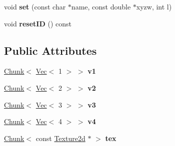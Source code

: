 \begin{DoxyCompactItemize}
\item 
\hypertarget{class_tempest_1_1_shader_input_acc0dcca2f2702d985cb5af596236c417}{void {\bfseries set} (const char $\ast$name, const double $\ast$xyzw, int l)}\label{class_tempest_1_1_shader_input_acc0dcca2f2702d985cb5af596236c417}

\item 
\hypertarget{class_tempest_1_1_shader_input_a1c6510d5221bc838ae7df197134ef480}{void {\bfseries reset\+I\+D} () const }\label{class_tempest_1_1_shader_input_a1c6510d5221bc838ae7df197134ef480}

\end{DoxyCompactItemize}
\subsection*{Public Attributes}
\begin{DoxyCompactItemize}
\item 
\hypertarget{class_tempest_1_1_shader_input_af6f24ecc1ce4afdccc8514c47ace04e5}{\hyperlink{struct_tempest_1_1_shader_input_1_1_chunk}{Chunk}$<$ \hyperlink{struct_tempest_1_1_shader_input_1_1_vec}{Vec}$<$ 1 $>$ $>$ {\bfseries v1}}\label{class_tempest_1_1_shader_input_af6f24ecc1ce4afdccc8514c47ace04e5}

\item 
\hypertarget{class_tempest_1_1_shader_input_a22c5d46725a2d6d776018016798e1d48}{\hyperlink{struct_tempest_1_1_shader_input_1_1_chunk}{Chunk}$<$ \hyperlink{struct_tempest_1_1_shader_input_1_1_vec}{Vec}$<$ 2 $>$ $>$ {\bfseries v2}}\label{class_tempest_1_1_shader_input_a22c5d46725a2d6d776018016798e1d48}

\item 
\hypertarget{class_tempest_1_1_shader_input_a8667a5efe121523eedc46b9c3569a0b8}{\hyperlink{struct_tempest_1_1_shader_input_1_1_chunk}{Chunk}$<$ \hyperlink{struct_tempest_1_1_shader_input_1_1_vec}{Vec}$<$ 3 $>$ $>$ {\bfseries v3}}\label{class_tempest_1_1_shader_input_a8667a5efe121523eedc46b9c3569a0b8}

\item 
\hypertarget{class_tempest_1_1_shader_input_aed010d7cc180c9925a51489a42e74323}{\hyperlink{struct_tempest_1_1_shader_input_1_1_chunk}{Chunk}$<$ \hyperlink{struct_tempest_1_1_shader_input_1_1_vec}{Vec}$<$ 4 $>$ $>$ {\bfseries v4}}\label{class_tempest_1_1_shader_input_aed010d7cc180c9925a51489a42e74323}

\item 
\hypertarget{class_tempest_1_1_shader_input_a76c7723bd8ec70722cc31ffaeff993ea}{\hyperlink{struct_tempest_1_1_shader_input_1_1_chunk}{Chunk}$<$ const \hyperlink{class_tempest_1_1_texture2d}{Texture2d} $\ast$ $>$ {\bfseries tex}}\label{class_tempest_1_1_shader_input_a76c7723bd8ec70722cc31ffaeff993ea}


\end{DoxyCompactItemize}
